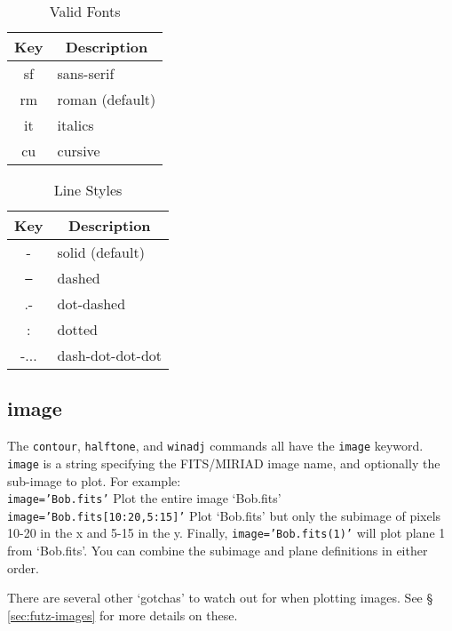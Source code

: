 \documentclass[12pt]{article}
\begin{document}
\begin{table}
\caption{\label{tab:fonts} Valid Fonts}
\begin{center}
\begin{tabular}{cl}
\hline
\hline
\multicolumn{1}{c}{Key} & \multicolumn{1}{c}{Description}\\
\hline
sf & sans-serif\\
rm & roman (default)\\
it & italics\\
cu & cursive\\
\hline
\end{tabular}
\end{center}
\end{table}

\begin{table}
\caption{\label{tab:lstyles} Line Styles}
\begin{center}
\begin{tabular}{cl}
\hline
\hline
\multicolumn{1}{c}{Key} & \multicolumn{1}{c}{Description}\\
\hline
  -  & solid (default)\\
 \texttt{--}  & dashed\\
 .-  & dot-dashed\\
  :  & dotted\\
-... & dash-dot-dot-dot\\
\hline
\end{tabular}
\end{center}
\end{table}

\subsection{image}

The \texttt{contour}, \texttt{halftone}, and \texttt{winadj} commands all have
the \texttt{image} keyword.  \texttt{image} is a string specifying the
FITS/MIRIAD image name, and optionally the sub-image to plot.  For example:\\
\texttt{image='Bob.fits'} Plot the entire image `Bob.fits'\\
\texttt{image='Bob.fits[10:20,5:15]'} Plot `Bob.fits' but only the subimage of
pixels 10-20 in the x and 5-15 in the y.  Finally, \texttt{image='Bob.fits(1)'}
will plot plane 1 from `Bob.fits'.  You can combine the subimage and plane
definitions in either order.

There are several other `gotchas' to watch out for when plotting images.
See \S\,\ref{sec:futz-images} for more details on these.
\end{document}
